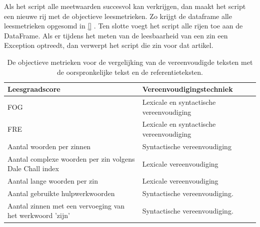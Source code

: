 Als het script alle meetwaarden succesvol kan verkrijgen, dan maakt het script een nieuwe rij met de objectieve leesmetrieken. Zo krijgt de dataframe alle leesmetrieken opgesomd in \ref{} . Ten slotte voegt het script alle rijen toe aan de DataFrame. Als er tijdens het meten van de leesbaarheid van een zin een Exception optreedt, dan verwerpt het script die zin voor dat artikel.

\begin{center}
	\begin{table}[H]
		\begin{tabular}{ | m{8cm} | m{7cm} | } 
			\hline
			\textbf{Leesgraadscore} & \textbf{Vereenvoudigingstechniek }\\
			\hline
			FOG & Lexicale en syntactische vereenvoudiging \\
			\hline
			FRE & Lexicale en syntactische vereenvoudiging \\
			\hline
			Aantal woorden per zinnen & Syntactische vereenvoudiging \\
			\hline
			Aantal complexe woorden per zin volgens Dale Chall index & Lexicale vereenvoudiging \\
			\hline
			Aantal lange woorden per zin & Lexicale vereenvoudiging \\
			\hline
			Aantal gebruikte hulpwerkwoorden & Syntactische vereenvoudiging. \\
			\hline
			Aantal zinnen met een vervoeging van het werkwoord 'zijn' & Syntactische vereenvoudiging. \\
			\hline
		\end{tabular}
		\caption{De objectieve metrieken voor de vergelijking van de vereenvoudigde teksten met de oorspronkelijke tekst en de referentieteksten.}
		\label{table:verg-studie-metrieken}
	\end{table}
\end{center}

